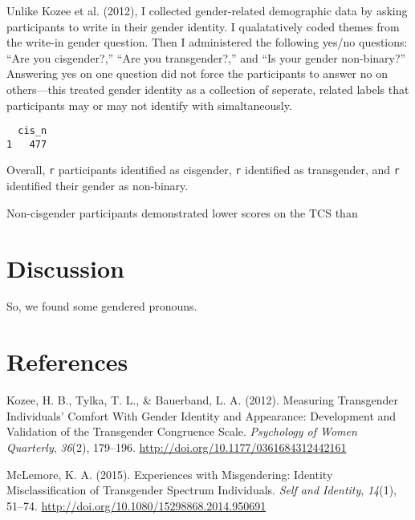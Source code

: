 \documentclass[12pt,twoside]{reedthesis}
\begin{document}
Unlike Kozee et al. (2012), I collected gender-related demographic data
by asking participants to write in their gender identity. I
qualatatively coded themes from the write-in gender question. Then I
administered the following yes/no questions: ``Are you cisgender?,''
``Are you transgender?,'' and ``Is your gender non-binary?'' Answering
yes on one question did not force the participants to answer no on
others---this treated gender identity as a collection of seperate,
related labels that participants may or may not identify with
simaltaneously.
\begin{verbatim}
  cis_n
1   477
\end{verbatim}
Overall, \texttt{r} participants identified as cisgender, \texttt{r}
identified as transgender, and \texttt{r} identified their gender as
non-binary.

Non-cisgender participants demonstrated lower scores on the TCS than

\chapter{Discussion}\label{discussion}

So, we found some gendered pronouns.

\appendix

\backmatter

\chapter*{References}\label{references}


\noindent

\setlength{\parindent}{-0.20in} \setlength{\leftskip}{0.20in}
\setlength{\parskip}{8pt}

\hypertarget{refs}{}
\hypertarget{ref-kozee_measuring_2012}{}
Kozee, H. B., Tylka, T. L., \& Bauerband, L. A. (2012). Measuring
Transgender Individuals' Comfort With Gender Identity and Appearance:
Development and Validation of the Transgender Congruence Scale.
\emph{Psychology of Women Quarterly}, \emph{36}(2), 179--196.
\url{http://doi.org/10.1177/0361684312442161}

\hypertarget{ref-mclemore_experiences_2015}{}
McLemore, K. A. (2015). Experiences with Misgendering: Identity
Misclassification of Transgender Spectrum Individuals. \emph{Self and
Identity}, \emph{14}(1), 51--74.
\url{http://doi.org/10.1080/15298868.2014.950691}
\end{document}

